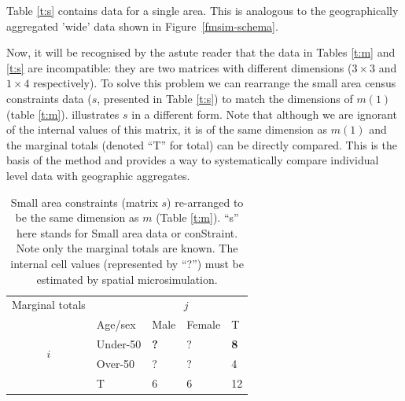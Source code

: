\documentclass[a4paper, 11pt, twoside]{article}
\begin{document}
Table \ref{t:s} contains data for a single area. This is analogous to the
geographically aggregated 'wide' data shown in Figure~\ref{fmsim-schema}.

\begin{table}[H]
\end{table}

Now, it will be recognised by the astute reader that the data in
Tables \ref{t:m} and \ref{t:s} are incompatible: they are
two matrices with different dimensions ($3 \times 3$ and $1 \times 4$ respectively).
To solve this problem we can rearrange the small area census constraints data
($s$, presented in Table \ref{t:s}) to match the dimensions of
$m(1)$ (table \ref{t:m}).
 illustrates $s$ in a different form.
Note that although we are ignorant of the internal values of this matrix,
it is of the same dimension as $m(1)$ and the marginal totals (denoted ``T'' for
total) can be directly compared. This is the basis of the method and provides a
way to systematically compare individual level data with geographic aggregates.

\begin{table}[h]
\centering
\caption[Small area constraints expressed as marginal totals]{Small
area constraints (matrix $s$) re-arranged to be the same dimension as $m$ (Table \ref{t:m}).
``s'' here stands for Small area data or conStraint. Note only
the marginal totals are known. The internal cell
values (represented by ``?'') must be estimated by spatial microsimulation.
}
\begin{tabular}{cllll}\toprule
Marginal totals&  & \multicolumn{2}{c}{$j$} & \\
& Age/sex & Male & Female & T\\ \midrule
\multirow{2}{*}{$i$} & Under-50 & \textbf{?} & ? & \textbf{\color{blue}8}\\
& Over-50 & ? & ? &4 \\
& T & 6 & 6 &12\\
\bottomrule
\end{tabular}
\label{t:s2}
\end{table}
\end{document}
